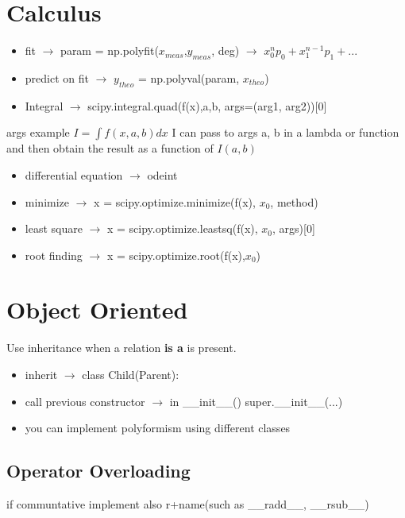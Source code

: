 \documentclass{article}
\begin{document}
\begin{multicols}{2}
\section{Calculus}
\begin{itemize}
\item fit $\rightarrow$ param = np.polyfit($x_{meas}$,$y_{meas}$, deg)  $\rightarrow$  $x_0^n p_0+x_1^{n-1} p_1 + ...$
\item predict on fit $\rightarrow$ $y_{theo}$ = np.polyval(param, $x_{theo}$)
\item Integral  $\rightarrow$ scipy.integral.quad(f(x),a,b, args=(arg1, arg2))[0] 
\end{itemize}
args  example $I = \int f(x,a,b) dx $ I can pass to args a, b in a lambda or function and then  obtain the result as a function of $I(a,b)$ 
\begin{itemize}
\item differential equation $\rightarrow$ odeint
\item minimize $\rightarrow$ x = scipy.optimize.minimize(f(x), $x_0$, method)
\item least square $\rightarrow$ x = scipy.optimize.leastsq(f(x), $x_0$, args)[0]
\item root finding $\rightarrow$ x = scipy.optimize.root(f(x),$x_0$)
\end{itemize}
\section{Object Oriented}
Use inheritance when a relation  \textbf{is a} is present.
\begin{itemize}
\item inherit $\rightarrow$ class Child(Parent):
\item call previous constructor $\rightarrow$ in \_\_init\_\_() super.\_\_init\_\_(...)
\item you can implement polyformism using different classes
\end{itemize}
\subsection{Operator Overloading}
if communtative implement also r+name(such as \_\_radd\_\_, \_\_rsub\_\_)
\begin{itemize}


\end{itemize}
\end{multicols}
\end{document}
